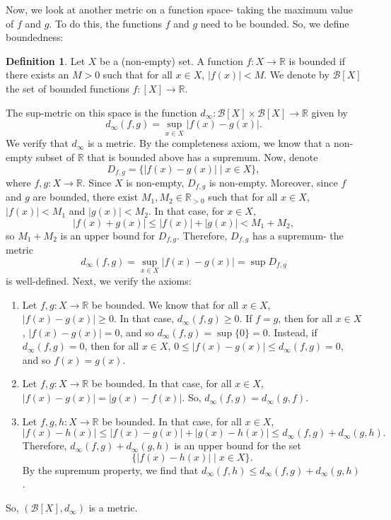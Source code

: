 \documentclass[a4paper, openany]{memoir}
\theoremstyle{definition}
\newtheorem{definition}{Definition}[section]
\theoremstyle{plain}
\begin{document}
Now, we look at another metric on a function space- taking the maximum value of $f$ and $g$. To do this, the functions $f$ and $g$ need to be bounded. So, we define boundedness:
\begin{definition}
Let $X$ be a (non-empty) set. A function $f: X \to \mathbb{R}$ is bounded if there exists an $M > 0$ such that for all $x \in X$, $|f(x)| < M$. We denote by $\mathcal{B}[X]$ the set of bounded functions $f: [X] \to \mathbb{R}$. 
\end{definition}
The sup-metric on this space is the function $d_\infty: \mathcal{B}[X] \times \mathcal{B}[X] \to \mathbb{R}$ given by
\[d_\infty(f, g) = \sup_{x \in X} |f(x) - g(x)|.\]
We verify that $d_\infty$ is a metric. By the completeness axiom, we know that a non-empty subset of $\mathbb{R}$ that is bounded above has a supremum. Now, denote
\[D_{f, g} = \{|f(x) - g(x)| \mid x \in X\},\]
where $f, g: X \to \mathbb{R}$. Since $X$ is non-empty, $D_{f, g}$ is non-empty. Moreover, since $f$ and $g$ are bounded, there exist $M_1, M_2 \in \mathbb{R}_{> 0}$ such that for all $x \in X$, $|f(x)| < M_1$ and $|g(x)| < M_2$. In that case, for $x \in X$,
\[|f(x) + g(x)| \leqslant |f(x)| + |g(x)| < M_1 + M_2,\]
so $M_1 + M_2$ is an upper bound for $D_{f, g}$. Therefore, $D_{f, g}$ has a supremum- the metric 
\[d_\infty(f, g) = \sup_{x \in X} |f(x) - g(x)| = \sup D_{f, g}\]
is well-defined. Next, we verify the axioms:
\begin{enumerate}[label=\textbf{M\arabic*}.]
    \item Let $f, g: X \to \mathbb{R}$ be bounded. We know that for all $x \in X$, $|f(x) - g(x)| \geqslant 0$. In that case, $d_\infty(f, g) \geqslant 0$. If $f = g$, then for all $x \in X$, $|f(x) - g(x)| = 0$, and so $d_\infty(f, g) = \sup \{0\} = 0$. Instead, if $d_\infty(f, g) = 0$, then for all $x \in X$, $0 \leqslant |f(x) - g(x)| \leqslant d_\infty(f, g) = 0$, and so $f(x) = g(x)$.
    
    \item Let $f, g: X \to \mathbb{R}$ be bounded. In that case, for all $x \in X$, $|f(x) - g(x)| = |g(x) - f(x)|$. So, $d_\infty(f, g) = d_\infty(g, f)$.
    
    \item Let $f, g, h: X \to \mathbb{R}$ be bounded. In that case, for all $x \in X$,
    \[|f(x) - h(x)| \leqslant |f(x) - g(x)| + |g(x) - h(x)| \leqslant d_\infty(f, g) + d_\infty(g, h).\]
    Therefore, $d_\infty(f, g) + d_\infty(g, h)$ is an upper bound for the set
    \[\{|f(x) - h(x)| \mid x \in X\}.\]
    By the supremum property, we find that $d_\infty(f, h) \leqslant d_\infty(f, g) + d_\infty(g, h)$.
\end{enumerate}
So, $(\mathcal{B}[X], d_\infty)$ is a metric.
\end{document}
